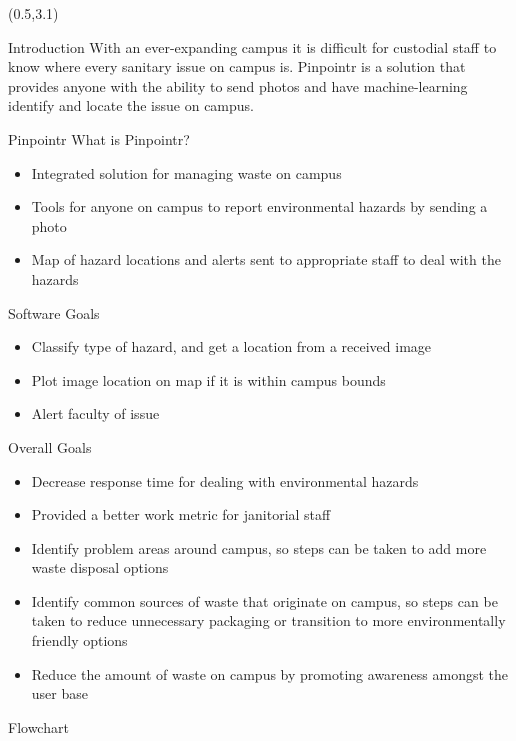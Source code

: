 \documentclass[22pt]{beamer}
\begin{document}
\begin{frame}[fragile]
\begin{textblock}{7.25}(0.5,3.1)

\begin{block}{Introduction}
With an ever-expanding campus it is difficult for custodial staff to know where every sanitary issue on campus is. Pinpointr is a solution that provides anyone with the ability to send photos and have machine-learning identify and locate the issue on campus.

\end{block}

\begin{block}{Pinpointr}
What is Pinpointr?
\begin{itemize}
\item Integrated solution for managing waste on campus
\item Tools for anyone on campus to report environmental hazards by sending a photo
\item Map of hazard locations and alerts sent to appropriate staff to deal with the hazards
\end{itemize}
Software Goals
\begin{itemize}
\item Classify type of hazard, and get a location from a received image
\item Plot image location on map if it is within campus bounds
\item Alert faculty of issue 
\end{itemize}
Overall Goals
\begin{itemize}
\item Decrease response time for dealing with environmental hazards
\item Provided a better work metric for janitorial staff
\item Identify problem areas around campus, so steps can be taken to add more waste disposal options
\item Identify common sources of waste that originate on campus, so steps can be taken to reduce unnecessary packaging or transition to more environmentally friendly options
\item Reduce the amount of waste on campus by promoting awareness amongst the user base
\end{itemize}
\end{block}

\begin{block}{Flowchart}

\end{block}


\end{textblock}
\end{frame}
\end{document}

